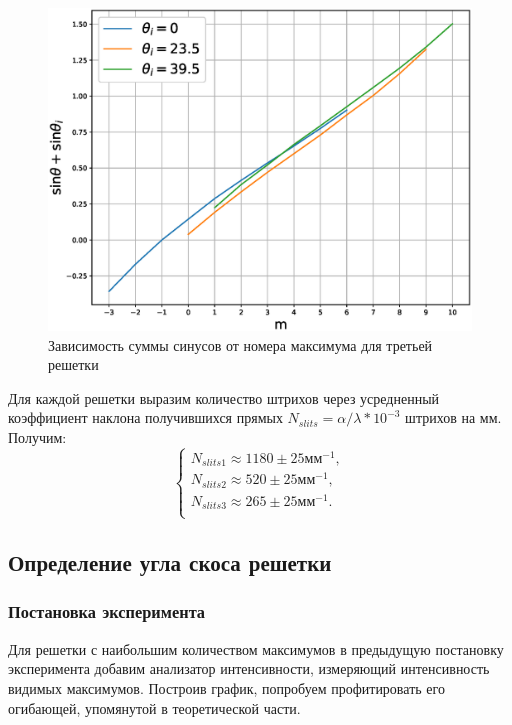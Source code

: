 \documentclass[a4paper,14pt]{extarticle}
\begin{document}
				\newpage
				
				\begin{figure}[h!]
					\centering
					\includegraphics[width=1\linewidth]{Fraun3.eps}
					\caption{Зависимость суммы синусов от номера максимума для третьей решетки}
					\label{fig5}
				\end{figure}				
				
				Для каждой решетки выразим количество штрихов через усредненный коэффициент наклона получившихся прямых $N_{slits} = \alpha / \lambda * 10^{-3}$ штрихов на мм. Получим:
				\begin{equation}
					\begin{cases}
						N_{slits 1} \approx 1180 \pm 25 \text{мм}^{-1}, \\
						N_{slits 2} \approx 520 \pm 25 \text{мм}^{-1}, \\
						N_{slits 3} \approx 265 \pm 25 \text{мм}^{-1}. \\
					\end{cases}
				\end{equation}
				
				\newpage
				
		\subsection{Определение угла скоса решетки}
			\subsubsection{Постановка эксперимента}
			Для решетки с наибольшим количеством максимумов в предыдущую постановку эксперимента добавим анализатор интенсивности, измеряющий интенсивность видимых максимумов. Построив график, попробуем профитировать его огибающей, упомянутой в теоретической части.
\end{document}
